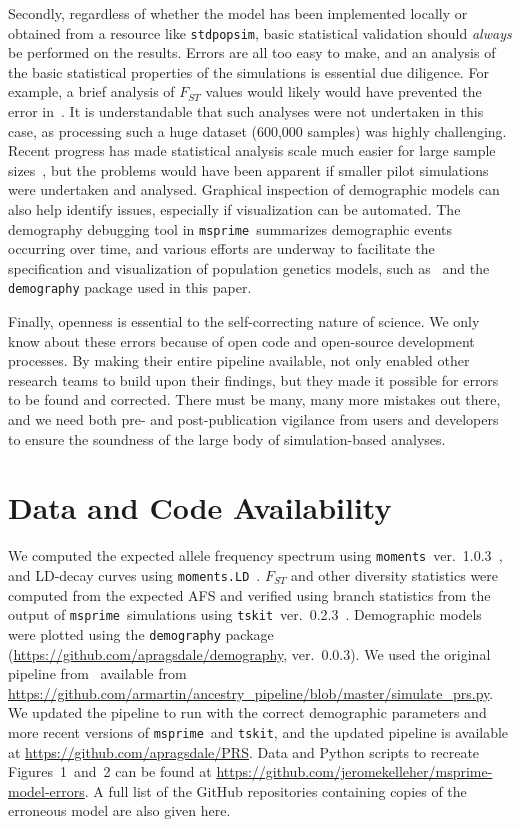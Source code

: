 \documentclass{article}
\newcommand{\msprime}[0]{\texttt{msprime}}
\newcommand{\stdpopsim}[0]{\texttt{stdpopsim}}
\newcommand{\tskit}[0]{\texttt{tskit}}
\begin{document}
Secondly, regardless of whether the model has been implemented
locally or obtained from a resource like \stdpopsim,
basic statistical validation should \emph{always} be performed on the
results. Errors are all too easy to make, and an analysis of the
basic statistical properties of the simulations is essential
due diligence. For example, a brief analysis of $F_{ST}$ values
would likely would have prevented the error in~\citet{martin2017human}.
It is understandable that such analyses were not undertaken in this
case, as processing such a huge dataset (600,000 samples) was
highly challenging. Recent progress has made statistical analysis scale much
easier for large sample sizes~\citep{ralph2020efficiently}, but the problems would have been
apparent if smaller pilot simulations were undertaken and analysed.
Graphical inspection of demographic models can also help identify issues, especially if
visualization can be automated. The demography debugging tool in \msprime\
summarizes demographic events occurring over time, and various efforts are underway to facilitate
the specification and visualization of population genetics models, such as~\citet{zhou2018popdemog}
and the \texttt{demography} package used in this paper.

Finally, openness is essential to the self-correcting nature of science.
We only know about these errors because of open code and
open-source development processes. By making their entire pipeline available,
\citet{martin2017human} not only enabled other research teams to build upon their findings,
but they made it possible for errors to be found and corrected.
There must be many, many more mistakes out there, and we need both
pre- and post-publication vigilance from users and developers to ensure the
soundness of the large body of simulation-based analyses.

\section*{Data and Code Availability}

We computed the expected allele frequency spectrum using
\texttt{moments}~ver.~1.0.3~\citep{jouganous2017inferring}, and LD-decay curves using
\texttt{moments.LD}~\citep{ragsdale2019models}. $F_{ST}$ and other diversity statistics
were computed from the expected AFS and verified using branch statistics from
the output of \msprime\ simulations using \tskit~ver.~0.2.3~\citep{ralph2020efficiently}.
Demographic models were plotted using the \texttt{demography} package
(\url{https://github.com/apragsdale/demography}, ver.~0.0.3).
We used the original pipeline from~\citet{martin2017human} available from
\url{https://github.com/armartin/ancestry_pipeline/blob/master/simulate_prs.py}.
We updated the pipeline to run with the correct demographic parameters and more
recent versions of \msprime\ and \tskit, and the updated pipeline is
available at \url{https://github.com/apragsdale/PRS}.
Data and Python scripts to recreate Figures~1~and~2 can be found at
\url{https://github.com/jeromekelleher/msprime-model-errors}.
A full list of the GitHub repositories containing copies of the erroneous
model are also given here.
\end{document}
